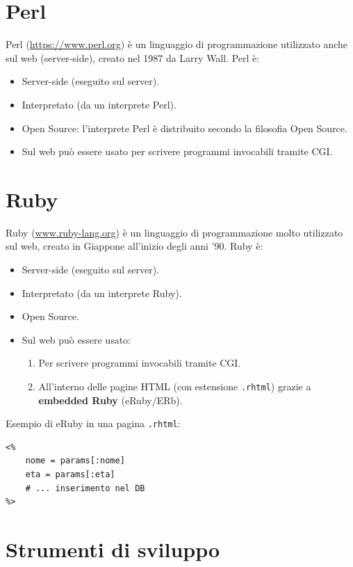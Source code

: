 \section{Perl}

Perl (\url{https://www.perl.org}) è un linguaggio di programmazione utilizzato anche sul web (server-side), creato nel 1987 da Larry Wall. Perl è:

\begin{itemize}
    \item Server-side (eseguito sul server).
    \item Interpretato (da un interprete Perl).
    \item Open Source: l'interprete Perl è distribuito secondo la filosofia Open Source.
    \item Sul web può essere usato per scrivere programmi invocabili tramite CGI.
\end{itemize}

\section{Ruby}

Ruby (\url{www.ruby-lang.org}) è un linguaggio di programmazione molto utilizzato sul web, creato in Giappone all'inizio degli anni '90. Ruby è:

\begin{itemize}
    \item Server-side (eseguito sul server).
    \item Interpretato (da un interprete Ruby).
    \item Open Source.
    \item Sul web può essere usato:
    \begin{enumerate}
        \item Per scrivere programmi invocabili tramite CGI.
        \item All'interno delle pagine HTML (con estensione \texttt{.rhtml}) grazie a \textbf{embedded Ruby} (eRuby/ERb).
    \end{enumerate}
\end{itemize}

Esempio di eRuby in una pagina \texttt{.rhtml}:

\begin{lstlisting}
<%
    nome = params[:nome]
    eta = params[:eta]
    # ... inserimento nel DB
%>
\end{lstlisting}

\section{Strumenti di sviluppo}

